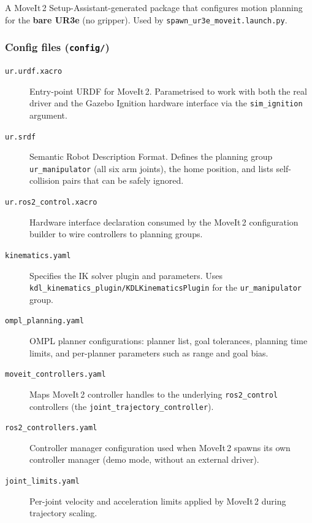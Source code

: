 \documentclass[11pt,a4paper]{article}
\newcommand{\file}[1]{\texttt{#1}}
\begin{document}
A MoveIt\,2 Setup-Assistant-generated package that configures motion
planning for the \textbf{bare UR3e} (no gripper). Used by
\file{spawn\_ur3e\_moveit.launch.py}.

\subsubsection{Config files (\file{config/})}

\begin{description}
  \item[\file{ur.urdf.xacro}]
    Entry-point URDF for MoveIt\,2. Parametrised to work with both the real
    driver and the Gazebo Ignition hardware interface via the
    \texttt{sim\_ignition} argument.

  \item[\file{ur.srdf}]
    Semantic Robot Description Format. Defines the planning group
    \texttt{ur\_manipulator} (all six arm joints), the home position, and
    lists self-collision pairs that can be safely ignored.

  \item[\file{ur.ros2\_control.xacro}]
    Hardware interface declaration consumed by the MoveIt\,2 configuration
    builder to wire controllers to planning groups.

  \item[\file{kinematics.yaml}]
    Specifies the IK solver plugin and parameters.
    Uses \texttt{kdl\_kinematics\_plugin/KDLKinematicsPlugin} for the
    \texttt{ur\_manipulator} group.

  \item[\file{ompl\_planning.yaml}]
    OMPL planner configurations: planner list, goal tolerances, planning
    time limits, and per-planner parameters such as range and goal bias.

  \item[\file{moveit\_controllers.yaml}]
    Maps MoveIt\,2 controller handles to the underlying
    \texttt{ros2\_control} controllers (the \texttt{joint\_trajectory\_controller}).

  \item[\file{ros2\_controllers.yaml}]
    Controller manager configuration used when MoveIt\,2 spawns its own
    controller manager (demo mode, without an external driver).

  \item[\file{joint\_limits.yaml}]
    Per-joint velocity and acceleration limits applied by MoveIt\,2 during
    trajectory scaling.


\end{description}
\end{document}
